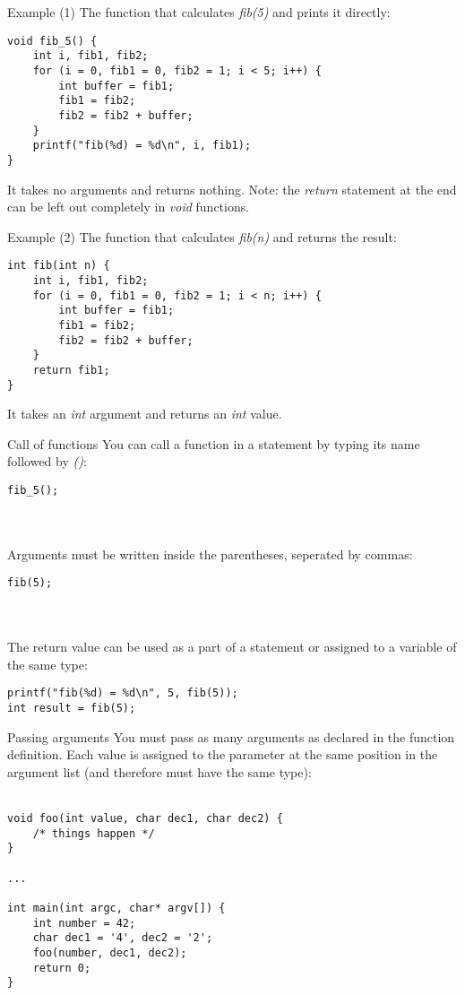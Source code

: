 \begin{frame}[fragile]{Example (1)}
	The function that calculates \textit{fib(5)} and prints it directly:
	\begin{lstlisting}
void fib_5() {
	int i, fib1, fib2;
	for (i = 0, fib1 = 0, fib2 = 1; i < 5; i++) {
		int buffer = fib1;
		fib1 = fib2;
		fib2 = fib2 + buffer;
	}
	printf("fib(%d) = %d\n", i, fib1);
}
\end{lstlisting}
	It takes no arguments and returns nothing.
	Note: the \textit{return} statement at the end can be left out completely in \textit{void} functions.
\end{frame}
\begin{frame}[fragile]{Example (2)}
	The function that calculates \textit{fib(n)} and returns the result:
	\begin{lstlisting}
int fib(int n) {
	int i, fib1, fib2;
	for (i = 0, fib1 = 0, fib2 = 1; i < n; i++) {
		int buffer = fib1;
		fib1 = fib2;
		fib2 = fib2 + buffer;
	}
	return fib1;
}
\end{lstlisting}
		It takes an \textit{int} argument and returns an \textit{int} value.
\end{frame}
\begin{frame}[fragile]{Call of functions}
	You can call a function in a statement by typing its name followed by \textit{()}:
	\begin{lstlisting}[numbers=none]
fib_5();
\end{lstlisting} \ \\ \ \\
	Arguments must be written inside the parentheses, seperated by commas:
	\begin{lstlisting}[numbers=none]
fib(5);
\end{lstlisting} \ \\ \ \\
	The return value can be used as a part of a statement or assigned to a variable of the same type:
	\begin{lstlisting}[numbers=none]
printf("fib(%d) = %d\n", 5, fib(5));
int result = fib(5);
\end{lstlisting}
\end{frame}
\begin{frame}[fragile]{Passing arguments}
	You must pass as many arguments as declared in the function definition. Each value is assigned to the parameter at the same position in the argument list (and therefore must have the same type): \ \\ \ \\
	\begin{lstlisting}
void foo(int value, char dec1, char dec2) {
	/* things happen */
}

...

int main(int argc, char* argv[]) {
	int number = 42;
	char dec1 = '4', dec2 = '2';
	foo(number, dec1, dec2);
	return 0;
}
\end{lstlisting}
\end{frame}
